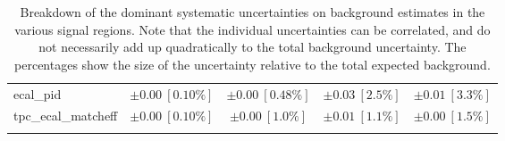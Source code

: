 \begin{table}
\begin{center}
\begin{tabular*}{\textwidth}{@{\extracolsep{\fill}}lcccc}
ecal\_pid         & $\pm 0.00\ [0.10\%] $          & $\pm 0.00\ [0.48\%] $          & $\pm 0.03\ [2.5\%] $          & $\pm 0.01\ [3.3\%] $       \\
tpc\_ecal\_matcheff         & $\pm 0.00\ [0.10\%] $          & $\pm 0.00\ [1.0\%] $          & $\pm 0.01\ [1.1\%] $          & $\pm 0.00\ [1.5\%] $       \\
\noalign{\smallskip}\hline\noalign{\smallskip}
\end{tabular*}
\end{center}
\caption[Breakdown of uncertainty on background estimates]{
Breakdown of the dominant systematic uncertainties on background estimates in the various signal regions.
Note that the individual uncertainties can be correlated, and do not necessarily add up quadratically to 
the total background uncertainty. The percentages show the size of the uncertainty relative to the total expected background.
\label{table.results.bkgestimate.uncertainties.SR1_FGD1_FHC_SR1_FGD1_RHC_SR1_FGD2_FHC_SR1_FGD2_RHC}}
\end{table}
%
